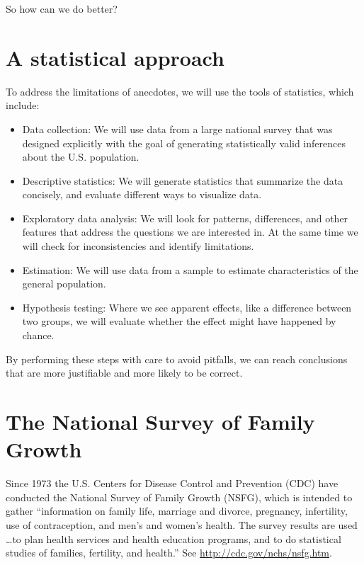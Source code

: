 \documentclass[12pt]{book}
\begin{document}
So how can we do better?


\section{A statistical approach}

To address the limitations of anecdotes, we will use the tools
of statistics, which include:

\begin{itemize}

\item Data collection: We will use data from a large national survey
  that was designed explicitly with the goal of generating
  statistically valid inferences about the U.S. population.

\item Descriptive statistics: We will generate statistics that
  summarize the data concisely, and evaluate different ways to
  visualize data.

\item Exploratory data analysis: We will look for
  patterns, differences, and other features that address the questions
  we are interested in.  At the same time we will check for
  inconsistencies and identify limitations.

\item Estimation: We will use data from a sample to estimate
  characteristics of the general population.

\item Hypothesis testing: Where we see apparent effects, like a
  difference between two groups, we will evaluate whether the effect
  might have happened by chance.

\end{itemize}

By performing these steps with care to avoid pitfalls, we can
reach conclusions that are more justifiable and more likely to be
correct.


\section{The National Survey of Family Growth}
\label{nsfg}

Since 1973 the U.S. Centers for Disease Control and Prevention (CDC)
have conducted the National Survey of Family Growth (NSFG),
which is intended to gather ``information on family life, marriage and
divorce, pregnancy, infertility, use of contraception, and men's and
women's health. The survey results are used \ldots to plan health services and
health education programs, and to do statistical studies of families,
fertility, and health.''  See
  \url{http://cdc.gov/nchs/nsfg.htm}.
\end{document}
